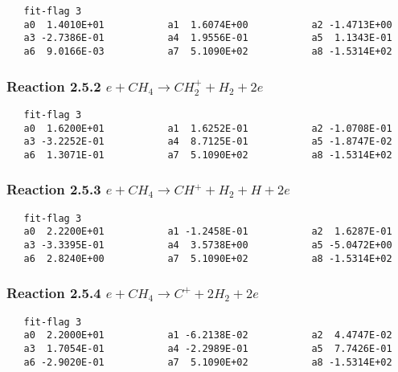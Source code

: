 \documentclass[12pt]{article}
\begin{document}
\begin{small}\begin{verbatim} 
   fit-flag 3
   a0  1.4010E+01           a1  1.6074E+00           a2 -1.4713E+00 
   a3 -2.7386E-01           a4  1.9556E-01           a5  1.1343E-01 
   a6  9.0166E-03           a7  5.1090E+02           a8 -1.5314E+02
\end{verbatim}\end{small}


\subsubsection{
Reaction 2.5.2     $e + CH_{4} \rightarrow CH_{2}^{+} + H_{2} + 2e$
}
 
\begin{small}\begin{verbatim} 
   fit-flag 3
   a0  1.6200E+01           a1  1.6252E-01           a2 -1.0708E-01 
   a3 -3.2252E-01           a4  8.7125E-01           a5 -1.8747E-02 
   a6  1.3071E-01           a7  5.1090E+02           a8 -1.5314E+02
 \end{verbatim}\end{small}


\subsubsection{
Reaction 2.5.3     $e + CH_{4} \rightarrow CH^{+} + H_{2} + H + 2e$
}
 
\begin{small}\begin{verbatim} 
   fit-flag 3
   a0  2.2200E+01           a1 -1.2458E-01           a2  1.6287E-01 
   a3 -3.3395E-01           a4  3.5738E+00           a5 -5.0472E+00 
   a6  2.8240E+00           a7  5.1090E+02           a8 -1.5314E+02
 \end{verbatim}\end{small}


\subsubsection{
Reaction 2.5.4     $e + CH_{4} \rightarrow C^{+} + 2H_{2} + 2e $
}
 
\begin{small}\begin{verbatim} 
   fit-flag 3
   a0  2.2000E+01           a1 -6.2138E-02           a2  4.4747E-02 
   a3  1.7054E-01           a4 -2.2989E-01           a5  7.7426E-01 
   a6 -2.9020E-01           a7  5.1090E+02           a8 -1.5314E+02
 \end{verbatim}\end{small}
\end{document}
